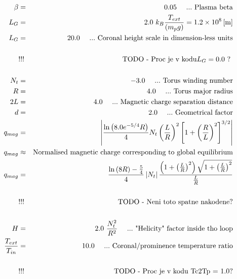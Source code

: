 \begin{eqnarray}
\beta & = & 0.05\ \ \ \ ...\ \text{Plasma beta}\\
L_G & = & 2.0\ k_B \frac{T_{ext}}{\lo m_p g \ro} = 1.2 \times 10^8 \left[\text{m}\right]\\
L_G & = & 20.0 \ \ \ \ ...\ \text{Coronal height scale in dimension-less units}\\
\\
& !!! & \text{TODO - Proc je v kodu} L_G = 0.0 \ ?\
\\ \\
N_t & = &-3.0\ \ \ \ ...\ \text{Torus winding number}\\
R & = &4.0\ \ \ \ ...\ \text{Torus major radius}\\
2L & = & 4.0\ \ \ \ ...\ \text{Magnetic charge separation distance}\\
d & = & 2.0\ \ \ \ ...\ \text{Geometrical factor}\\
q_{mag} & = & \left| \frac{\ln\lo 8.0 e^{-5/4} R\ro}{4} N_t \lo\frac{L}{R}\ro^2\left[1 + \lo\frac{R}{L}\ro^2\right]^{3/2}\right|\\
q_{mag} & \approx & \text{Normalised magnetic charge corresponding to global equilibrium}\\
q_{mag} & = & \frac{ \ln\lo 8R \ro - \frac{5}{4}}{4} \left| N_t \right| \frac{\lo 1 + \lo\frac{L}{R}\ro^2\ro \sqrt{1 + \lo\frac{L}{R}\ro^2}}{\frac{L}{R}}\\
\\
& !!! & \text{TODO - Neni toto spatne nakodene?}
\\\ \\
H & = & 2.0\ \frac{N_t^2}{R^2}\ \ \ \ ...\ \text{"Helicity" factor inside tho loop}\\
\frac{ T_{ext} }{T_{in}} & = & 10.0\ \ \ \ ...\ \text{Coronal/prominence temperature ratio}\\
\\
& !!! & \text{TODO - Proc je v kodu Tc2Tp = 1.0?}
\\\ \\
\end{eqnarray}